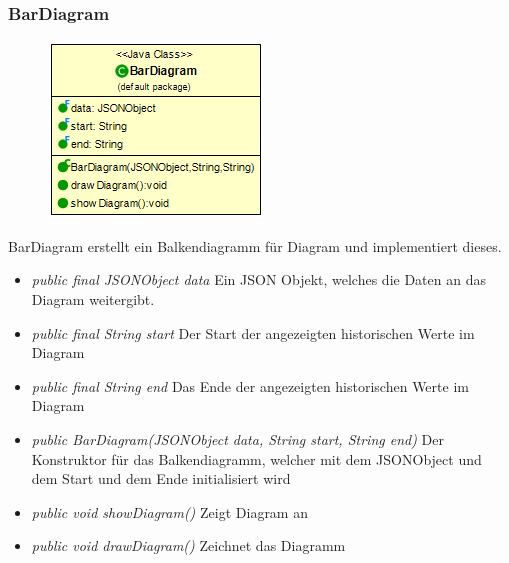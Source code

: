 \subsubsection{BarDiagram}
\begin{minipage}{0.3\textwidth}
    \begin{figure}[H]
        \includegraphics[scale = 0.5
        ]{media/view/diagram/BarDiagram_Class.png}
    \end{figure}
    \end{minipage} \hfill
    \begin{minipage}{0.6\textwidth}
BarDiagram erstellt ein Balkendiagramm für Diagram und implementiert dieses.
\end{minipage}
\begin{itemize} [noitemsep]
    \item \emph{public final JSONObject data} Ein JSON Objekt, welches die Daten an das Diagram weitergibt.
    \item \emph{public final String start} Der Start der angezeigten historischen Werte im Diagram
    \item \emph{public final String end} Das Ende der angezeigten historischen Werte im Diagram
    \item \emph{public BarDiagram(JSONObject data, String start, String end)} Der Konstruktor für das Balkendiagramm, welcher mit dem JSONObject und dem Start und dem Ende initialisiert wird
    \item \emph{public void showDiagram()} Zeigt Diagram an
    \item \emph{public void drawDiagram()} Zeichnet das Diagramm
\end{itemize}

